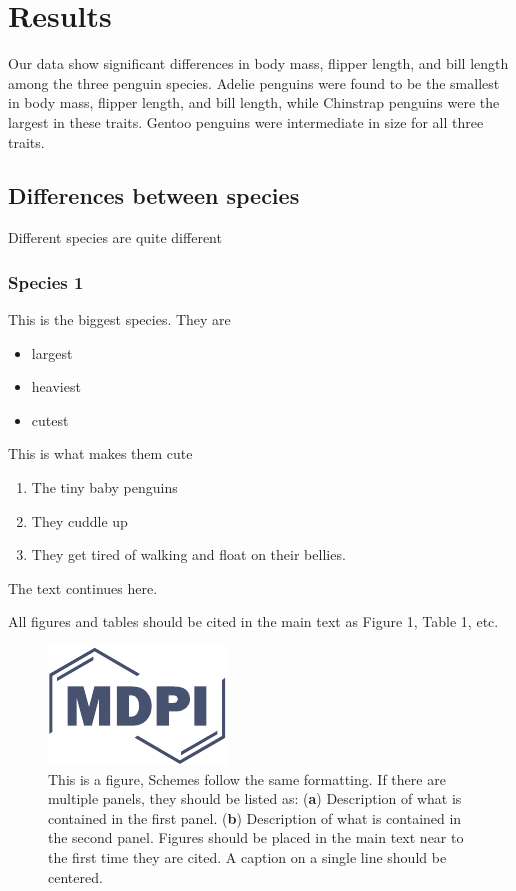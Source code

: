 \documentclass[water,article,submit,moreauthors,pdftex]{mdpi}
\providecommand{\tightlist}{%
  \setlength{\itemsep}{0pt}\setlength{\parskip}{0pt}}
\begin{document}
\hypertarget{results}{%
\section{Results}\label{results}}

Our data show significant differences in body mass, flipper length, and
bill length among the three penguin species. Adelie penguins were found
to be the smallest in body mass, flipper length, and bill length, while
Chinstrap penguins were the largest in these traits. Gentoo penguins
were intermediate in size for all three traits.

\hypertarget{differences-between-species}{%
\subsection{Differences between
species}\label{differences-between-species}}

Different species are quite different

\hypertarget{species-1}{%
\subsubsection{Species 1}\label{species-1}}

This is the biggest species. They are

\begin{itemize}
\tightlist
\item
  largest
\item
  heaviest
\item
  cutest
\end{itemize}

This is what makes them cute

\begin{enumerate}
\def\labelenumi{\arabic{enumi}.}
\tightlist
\item
  The tiny baby penguins
\item
  They cuddle up
\item
  They get tired of walking and float on their bellies.
\end{enumerate}

The text continues here.

All figures and tables should be cited in the main text as Figure 1,
Table 1, etc.

\begin{figure}[H]
\centering
\includegraphics[width=3 cm]{logo-mdpi}
\caption{This is a figure, Schemes follow the same formatting. If there are multiple panels, they should be listed as: (\textbf{a}) Description of what is contained in the first panel. (\textbf{b}) Description of what is contained in the second panel. Figures should be placed in the main text near to the first time they are cited. A caption on a single line should be centered.}
\end{figure}
\end{document}
